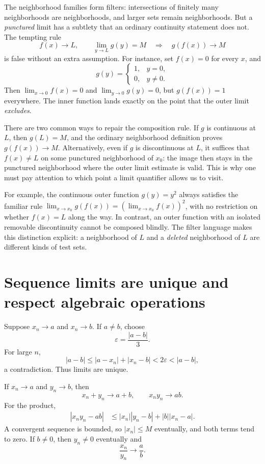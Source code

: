 The neighborhood families form filters: intersections of finitely many neighborhoods are neighborhoods, and larger sets remain neighborhoods. But a \emph{punctured} limit has a subtlety that an ordinary continuity statement does not. The tempting rule
\[
 f(x)\longrightarrow L,\qquad
 \lim_{y\to L}g(y)=M
 \quad\Longrightarrow\quad
 g(f(x))\longrightarrow M
\]
is false without an extra assumption. For instance, set \(f(x)=0\) for every \(x\), and
\[
 g(y)=
 \begin{cases}1,&y=0,\\0,&y\ne0.\end{cases}
\]
Then \(\lim_{x\to0}f(x)=0\) and \(\lim_{y\to0}g(y)=0\), but
\(g(f(x))=1\) everywhere. The inner function lands exactly on the point that the outer limit \emph{excludes}.

There are two common ways to repair the composition rule. If \(g\) is continuous at \(L\), then \(g(L)=M\), and the ordinary neighborhood definition proves \(g(f(x))\to M\). Alternatively, even if \(g\) is discontinuous at \(L\), it suffices that \(f(x)\ne L\) on some punctured neighborhood of \(x_0\): the image then stays in the punctured neighborhood where the outer limit estimate is valid. This is why one must pay attention to which point a limit quantifier allows us to visit.

For example, the continuous outer function \(g(y)=y^2\) always satisfies the familiar rule
\(\lim_{x\to x_0}g(f(x))=(\lim_{x\to x_0}f(x))^2\), with no restriction on whether \(f(x)=L\) along the way. In contrast, an outer function with an isolated removable discontinuity cannot be composed blindly. The filter language makes this distinction explicit: a neighborhood of \(L\) and a \emph{deleted} neighborhood of \(L\) are different kinds of test sets.

\section{Sequence limits are unique and respect algebraic operations}

Suppose \(x_n\to a\) and \(x_n\to b\).  If \(a\ne b\), choose
\[
  \varepsilon=\frac{|a-b|}{3}.
\]
For large \(n\),
\[
  |a-b|
  \le|a-x_n|+|x_n-b|
  <2\varepsilon
  <|a-b|,
\]
a contradiction.  Thus limits are unique.

If \(x_n\to a\) and \(y_n\to b\), then
\[
  x_n+y_n\to a+b,
  \qquad
  x_ny_n\to ab.
\]
For the product,
\[
\begin{aligned}
  |x_ny_n-ab|
  &\le |x_n||y_n-b|+|b||x_n-a|.
\end{aligned}
\]
A convergent sequence is bounded, so \(|x_n|\le M\) eventually, and both terms tend to zero.  If \(b\ne0\), then \(y_n\ne0\) eventually and
\[
  \frac{x_n}{y_n}\to\frac ab.
\]

